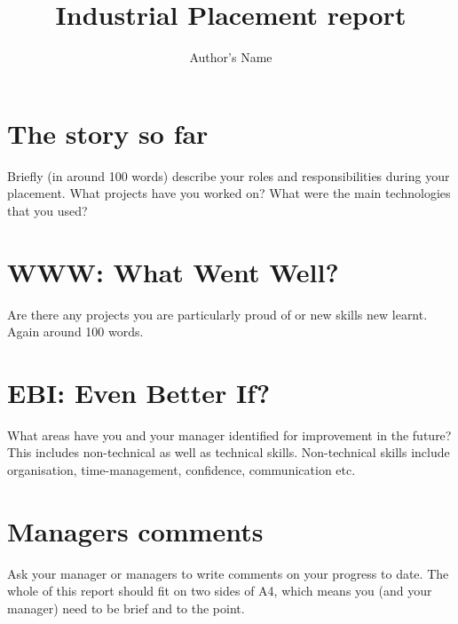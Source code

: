 \documentclass{article}
\begin{document}
\title{Industrial Placement report}
\author{Author's Name}

\maketitle


\section{The story so far}
Briefly (in around 100 words) describe your roles and responsibilities during your placement. What projects have you worked on? What were the main technologies that you used?

\section{WWW: What Went Well?}
Are there any projects you are particularly proud of or new skills new learnt. Again around 100 words.

\section{EBI: Even Better If?}
What areas have you and your manager identified for improvement in the future? This includes non-technical as well as technical skills. Non-technical skills include organisation, time-management, confidence, communication etc. 
 
\section{Managers comments}
Ask your manager or managers to write comments on your progress to date. The whole of this report should fit on two sides of A4, which means you (and your manager) need to be brief and to the point.
\end{document}
